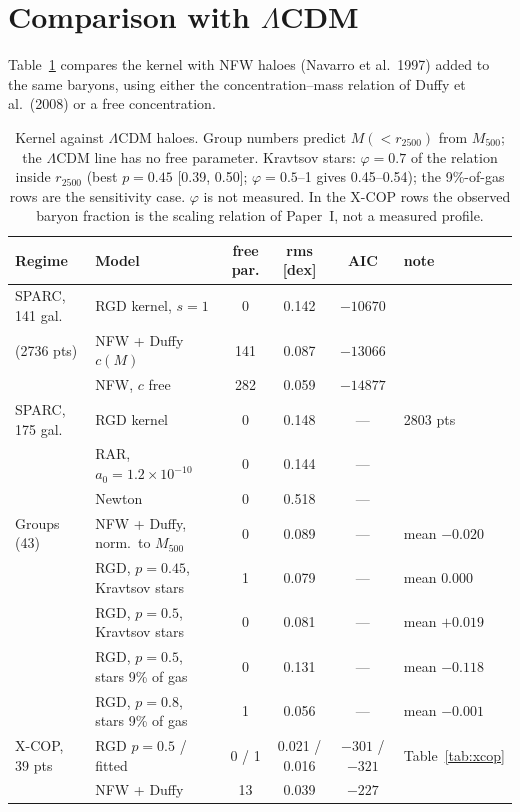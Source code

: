 \documentclass[11pt,a4paper]{article}
\begin{document}
\section{Comparison with $\Lambda$CDM}
\label{sec:lcdm}
Table~\ref{tab:lcdm} compares the kernel with NFW haloes (Navarro et al.\ 1997) added to the same baryons, using either the concentration--mass relation of Duffy et al.\ (2008) or a free concentration.

\begin{table}[h]
\centering\footnotesize\setlength{\tabcolsep}{3.5pt}
\begin{tabular}{p{2.2cm}p{4.4cm}cccp{1.9cm}}
\toprule
Regime & Model & free par. & rms [dex] & AIC & note \\
\midrule
SPARC, 141 gal.\ & RGD kernel, $s=1$ & 0 & 0.142 & $-10670$ & \\
(2736 pts) & NFW + Duffy $c(M)$ & 141 & 0.087 & $-13066$ & \\
 & NFW, $c$ free & 282 & 0.059 & $-14877$ & \\
\midrule
SPARC, 175 gal.\ & RGD kernel & 0 & 0.148 & --- & 2803 pts \\
 & RAR, $a_0=1.2\times10^{-10}$ & 0 & 0.144 & --- & \\
 & Newton & 0 & 0.518 & --- & \\
\midrule
Groups (43) & NFW + Duffy, norm.\ to $M_{500}$ & 0 & 0.089 & --- & mean $-0.020$ \\
 & RGD, $p=0.45$, Kravtsov stars & 1 & 0.079 & --- & mean $0.000$ \\
 & RGD, $p=0.5$, Kravtsov stars & 0 & 0.081 & --- & mean $+0.019$ \\
 & RGD, $p=0.5$, stars 9\% of gas & 0 & 0.131 & --- & mean $-0.118$ \\
 & RGD, $p=0.8$, stars 9\% of gas & 1 & 0.056 & --- & mean $-0.001$ \\
\midrule
X-COP, 39 pts & RGD $p=0.5$ / fitted & 0 / 1 & 0.021 / 0.016 & $-301$ / $-321$ & Table~\ref{tab:xcop} \\
 & NFW + Duffy & 13 & 0.039 & $-227$ & \\
\bottomrule
\end{tabular}
\caption{Kernel against $\Lambda$CDM haloes. Group numbers predict $M(<r_{2500})$ from $M_{500}$; the $\Lambda$CDM line has no free parameter. Kravtsov stars: $\varphi=0.7$ of the relation inside $r_{2500}$ (best $p=0.45$ [0.39, 0.50]; $\varphi=0.5$--1 gives 0.45--0.54); the 9\%-of-gas rows are the sensitivity case. $\varphi$ is not measured. In the X-COP rows the observed baryon fraction is the scaling relation of Paper~I, not a measured profile.}
\label{tab:lcdm}
\end{table}
\end{document}
